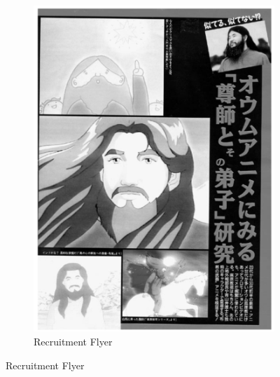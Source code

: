 \documentclass[12pt, letterpaper]{article}
\begin{document}
\begin{figure}[h!]
\begin{subfigure}[b]{.4\linewidth}
    \includegraphics[width=\linewidth]{flyer.png}
    \caption{Recruitment Flyer}
  \end{subfigure}
\end{figure}
\end{document}
